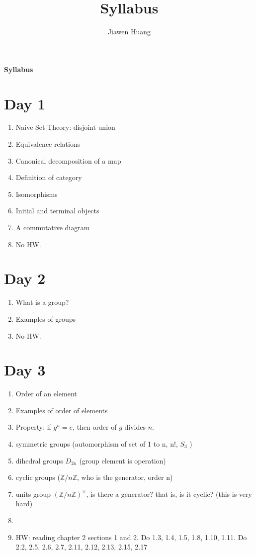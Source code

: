 \documentclass[12pt]{scrartcl}
\newcommand{\Z}{\mathbb{Z}}
\begin{document}
\title{Syllabus}
\author{Jiawen Huang}
\vspace{0.1cm}
\begin{center}
    \LARGE \textbf{Syllabus}
\end{center}

\section{Day 1}
\begin{enumerate}
    \item Naive Set Theory: disjoint union
    \item Equivalence relations
    \item Canonical decomposition of a map
    \item Definition of category
    \item Isomorphisms
    \item Initial and terminal objects
    \item A commutative diagram
    \item No HW. 
\end{enumerate}
\section{Day 2}
\begin{enumerate}
    \item What is a group?
    \item Examples of groups 
    \item No HW. 
\end{enumerate}

\section{Day 3}
\begin{enumerate}
    \item Order of an element
    \item Examples of order of elements
    \item Property: if $g^n=e$, then order of $g$ divides $n$.
    \item symmetric groups (automorphism of set of 1 to n, n!, $S_3$ )
    \item dihedral groups $D_{2n}$ (group element is operation)
    \item cyclic groups ($\Z/n\Z$, who is the generator, order n)
    \item units group $(\Z/n\Z)^\times$, is there a generator? that is, is it cyclic? (this is very hard)
    \item 
    \item HW: reading chapter 2 sections 1 and 2. Do 1.3, 1.4, 1.5, 1.8, 1.10, 1.11. Do 2.2, 2.5, 2.6, 2.7, 2.11, 2.12, 2.13, 2.15, 2.17
\end{enumerate}
\end{document}
